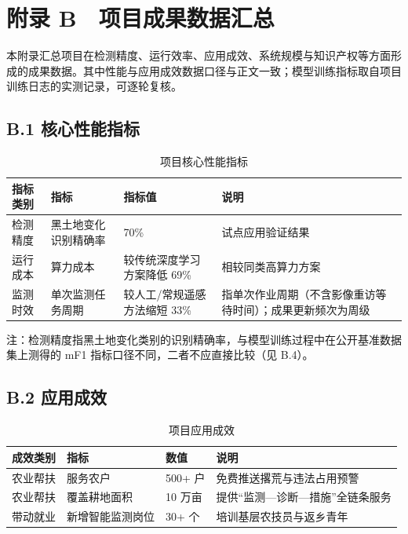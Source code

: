 \documentclass[12pt, a4paper]{ctexart}
\begin{document}
\section{附录 B　项目成果数据汇总}

本附录汇总项目在检测精度、运行效率、应用成效、系统规模与知识产权等方面形成的成果数据。其中性能与应用成效数据口径与正文一致；模型训练指标取自项目训练日志的实测记录，可逐轮复核。

\subsection{B.1 核心性能指标}

\begin{table}[htbp]
    \centering
    \caption{项目核心性能指标}
    \label{tab:perf}
    \small
    \begin{tabular}{|p{2.6cm}|p{4.4cm}|p{3.6cm}|p{3.2cm}|}
        \hline
        \textbf{指标类别} & \textbf{指标} & \textbf{指标值} & \textbf{说明} \\
        \hline
        检测精度 & 黑土地变化识别精确率 & 70\% & 试点应用验证结果 \\
        \hline
        运行成本 & 算力成本 & 较传统深度学习方案降低 69\% & 相较同类高算力方案 \\
        \hline
        监测时效 & 单次监测任务周期 & 较人工/常规遥感方法缩短 33\% & 指单次作业周期（不含影像重访等待时间）；成果更新频次为周级 \\
        \hline
    \end{tabular}
    \par\vspace{2pt}
    {\footnotesize 注：检测精度指黑土地变化类别的识别精确率，与模型训练过程中在公开基准数据集上测得的 mF1 指标口径不同，二者不应直接比较（见 B.4）。}
\end{table}

\subsection{B.2 应用成效}

\begin{table}[htbp]
    \centering
    \caption{项目应用成效}
    \label{tab:effect}
    \small
    \begin{tabular}{|p{3.0cm}|p{4.4cm}|p{3.0cm}|p{3.4cm}|}
        \hline
        \textbf{成效类别} & \textbf{指标} & \textbf{数值} & \textbf{说明} \\
        \hline
        农业帮扶 & 服务农户 & 500+ 户 & 免费推送撂荒与违法占用预警 \\
        \hline
        农业帮扶 & 覆盖耕地面积 & 10 万亩 & 提供“监测—诊断—措施”全链条服务 \\
        \hline
        带动就业 & 新增智能监测岗位 & 30+ 个 & 培训基层农技员与返乡青年 \\
        \hline
    \end{tabular}
\end{table}
\end{document}
